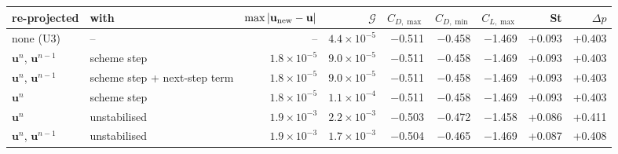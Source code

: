\begin{tabular}{llrrrrrrr}
\toprule
re-projected & with & $\max|\mathbf{u}_{\rm new} - \mathbf{u}|$ & $\mathcal{G}$ & $C_{D,\max}$ & $C_{D,\min}$ & $C_{L,\max}$ & St & $\Delta p$ \\
\midrule
none (U3) & -- & -- & $4.4\times10^{-5}$ & $-$0.511 & $-$0.458 & $-$1.469 & +0.093 & +0.403 \\
$\mathbf{u}^n$, $\mathbf{u}^{n-1}$ & scheme step & $1.8\times10^{-5}$ & $9.0\times10^{-5}$ & $-$0.511 & $-$0.458 & $-$1.469 & +0.093 & +0.403 \\
$\mathbf{u}^n$, $\mathbf{u}^{n-1}$ & scheme step + next-step term & $1.8\times10^{-5}$ & $9.0\times10^{-5}$ & $-$0.511 & $-$0.458 & $-$1.469 & +0.093 & +0.403 \\
$\mathbf{u}^n$ & scheme step & $1.8\times10^{-5}$ & $1.1\times10^{-4}$ & $-$0.511 & $-$0.458 & $-$1.469 & +0.093 & +0.403 \\
$\mathbf{u}^n$ & unstabilised & $1.9\times10^{-3}$ & $2.2\times10^{-3}$ & $-$0.503 & $-$0.472 & $-$1.458 & +0.086 & +0.411 \\
$\mathbf{u}^n$, $\mathbf{u}^{n-1}$ & unstabilised & $1.9\times10^{-3}$ & $1.7\times10^{-3}$ & $-$0.504 & $-$0.465 & $-$1.469 & +0.087 & +0.408 \\
\bottomrule
\end{tabular}
